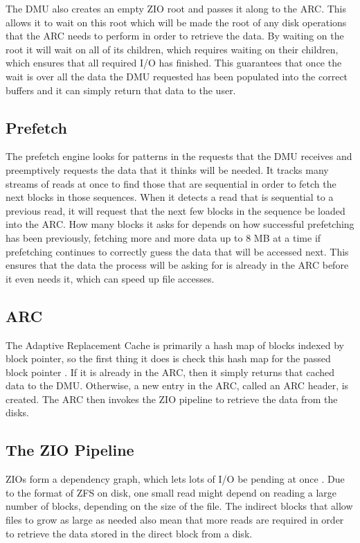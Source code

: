 The DMU also creates an empty ZIO root and passes it along to the ARC.
This allows it to wait on this root which will be made the root of any disk operations that the ARC
needs to perform in order to retrieve the data.
By waiting on the root it will wait on all of its children, which requires waiting on their children, 
which ensures that all required I/O has finished.
This guarantees that once the wait is over all the data the DMU requested has been populated into the correct buffers
and it can simply return that data to the user.

\subsection{Prefetch}
\label{chapter:prefetch}
The prefetch engine looks for patterns in the requests that the DMU receives and preemptively requests the data that it thinks will be needed\cite{ahrens_read_write}.
It tracks many streams of reads at once  to find those that are sequential in order to fetch the next blocks in those sequences.
When it detects a read that is sequential to a previous read, it will request that the next
few blocks in the sequence be loaded into the ARC.
How many blocks it asks for depends on how successful prefetching has been previously, fetching
more and more data up to 8 MB at a time if prefetching continues to correctly guess the data that will be
accessed next\cite[{module/zfs/dmu.c} {module/zfs/dbuf.c}]{zfs}.
This ensures that the data the process will be asking for is already in the ARC before it even needs it,
which can speed up file accesses.

\subsection{ARC}
The Adaptive Replacement Cache is primarily a hash map of blocks indexed by block pointer, 
so the first thing it does is check this hash map for the passed block pointer
\cite{ahrens_read_write,zfs}.
If it is already in the ARC, then it simply returns that cached data to the DMU.
Otherwise, a new entry in the ARC, called an ARC header, is created.
The ARC then invokes the ZIO pipeline to retrieve the data from the disks.

\subsection{The ZIO Pipeline}
ZIOs form a dependency graph, which lets lots of I/O be pending at once \cite{ahrens_read_write}. 
Due to the format of ZFS on disk, one small read might depend on reading a large number of blocks, 
depending on the size of the file.
The indirect blocks that allow files to grow as large as needed also mean that more reads are required 
in order to retrieve the data stored in the direct block from a disk.

